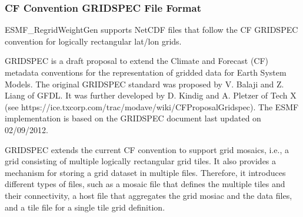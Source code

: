 \subsubsection{CF Convention GRIDSPEC File Format}\label{sec:fileformat:gridspec}

ESMF\_RegridWeightGen supports NetCDF files that follow the CF GRIDSPEC convention for logically rectangular lat/lon grids.

GRIDSPEC is a draft proposal to extend the Climate and Forecast (CF) metadata conventions for the representation of gridded data for Earth System Models.  The original GRIDSPEC standard was proposed by V. Balaji and Z. Liang of GFDL.  It was further developed by D. Kindig and A. Pletzer of Tech X (see  {https://ice.txcorp.com/trac/modave/wiki/CFProposalGridspec}).  The ESMF implementation is based on the GRIDSPEC document last updated on 02/09/2012.

GRIDSPEC extends the current CF convention to support grid  mosaics, i.e., a grid consisting of multiple logically
rectangular grid tiles. It also provides a mechanism for storing a grid dataset in multiple files.  Therefore,
it introduces different types of files, such as a mosaic file that defines the multiple tiles and their
connectivity, a host file that aggregates the grid mosiac and the data files, and a tile file for a single tile
grid definition.

